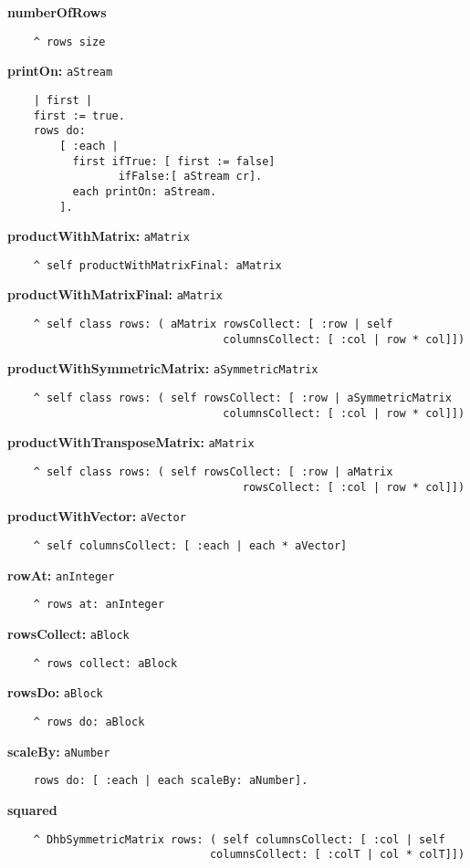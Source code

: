 {\bf numberOfRows}
\begin{verbatim}
    ^ rows size
\end{verbatim}
{\bf printOn:} {\tt aStream}
\begin{verbatim}
    | first |
    first := true.
    rows do: 
        [ :each |
          first ifTrue: [ first := false]
                 ifFalse:[ aStream cr].
          each printOn: aStream.
        ].
\end{verbatim}
{\bf productWithMatrix:} {\tt aMatrix}
\begin{verbatim}
    ^ self productWithMatrixFinal: aMatrix
\end{verbatim}
{\bf productWithMatrixFinal:} {\tt aMatrix}
\begin{verbatim}
    ^ self class rows: ( aMatrix rowsCollect: [ :row | self 
                                 columnsCollect: [ :col | row * col]])
\end{verbatim}
{\bf productWithSymmetricMatrix:} {\tt aSymmetricMatrix}
\begin{verbatim}
    ^ self class rows: ( self rowsCollect: [ :row | aSymmetricMatrix 
                                 columnsCollect: [ :col | row * col]])
\end{verbatim}
{\bf productWithTransposeMatrix:} {\tt aMatrix}
\begin{verbatim}
    ^ self class rows: ( self rowsCollect: [ :row | aMatrix 
                                    rowsCollect: [ :col | row * col]])
\end{verbatim}
{\bf productWithVector:} {\tt aVector}
\begin{verbatim}
    ^ self columnsCollect: [ :each | each * aVector]
\end{verbatim}
{\bf rowAt:} {\tt anInteger}
\begin{verbatim}
    ^ rows at: anInteger
\end{verbatim}
{\bf rowsCollect:} {\tt aBlock}
\begin{verbatim}
    ^ rows collect: aBlock
\end{verbatim}
{\bf rowsDo:} {\tt aBlock}
\begin{verbatim}
    ^ rows do: aBlock
\end{verbatim}
{\bf scaleBy:} {\tt aNumber}
\begin{verbatim}
    rows do: [ :each | each scaleBy: aNumber].
\end{verbatim}
{\bf squared}
\begin{verbatim}
    ^ DhbSymmetricMatrix rows: ( self columnsCollect: [ :col | self 
                               columnsCollect: [ :colT | col * colT]])
\end{verbatim}
